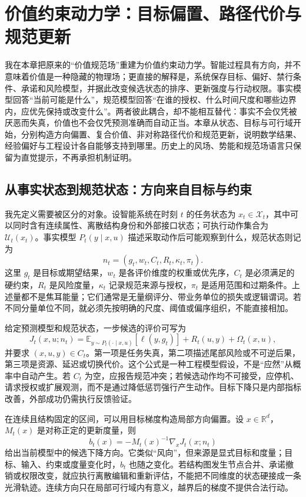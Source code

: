 \chapter{价值约束动力学：目标偏置、路径代价与规范更新}
\label{chp:value_gauge_field}

我在本章把原来的“价值规范场”重建为价值约束动力学。智能过程具有方向，并不意味着价值是一种隐藏的物理场；更直接的解释是，系统保存目标、偏好、禁行条件、承诺和风险模型，并据此改变候选状态的排序、更新强度与行动权限。事实模型回答“当前可能是什么”，规范模型回答“在谁的授权、什么时间尺度和哪些边界内，应优先保持或改变什么”。两者彼此耦合，却不能相互替代：事实不会仅凭被厌恶而失真，价值也不会仅凭预测准确而自动正当。本章从状态、目标与可行域开始，分别构造方向偏置、复合价值、非对称路径代价和规范更新，说明数学结果、经验偏好与工程设计各自能够支持到哪里。历史上的风场、势能和规范场语言只保留为直觉提示，不再承担机制证明。

\section{从事实状态到规范状态：方向来自目标与约束}
\label{sec:section_6725}

我先定义需要被区分的对象。设智能系统在时刻 $t$ 的任务状态为 $x_t\in\mathcal X_t$，其中可以同时含有连续属性、离散结构身份和外部接口状态；可执行动作集合为 $\mathcal U_t(x_t)$。事实模型 $P_t(y\mid x,u)$ 描述采取动作后可能观察到什么，规范状态则记为
\begin{equation}
    n_t=(g_t,w_t,C_t,R_t,\kappa_t,\pi_t).
\end{equation}
这里 $g_t$ 是目标或期望结果，$w_t$ 是各评价维度的权重或优先序，$C_t$ 是必须满足的硬约束，$R_t$ 是风险度量，$\kappa_t$ 记录规范来源与授权，$\pi_t$ 是适用范围和过期条件。上述量都不是焦耳能量；它们通常是无量纲评分、带业务单位的损失或逻辑谓词。若不同分量单位不同，就必须先按明确的尺度、阈值或偏序组织，不能直接相加。

给定预测模型和规范状态，一步候选的评价可写为
\begin{equation}
    J_t(x,u;n_t)
    =\mathbb E_{y\sim P_t(\cdot\mid x,u)}[\ell(y,g_t)]
     +R_t(u,y)+\Omega_t(x,u),
\end{equation}
并要求 $(x,u,y)\in C_t$。第一项是任务失真，第二项描述尾部风险或不可逆后果，第三项是资源、延迟或切换代价。这个公式是一种工程模型假设，不是“应然”从概率中自动产生。若 $C_t$ 为空，应报告规范冲突；若候选动作均不可接受，应停机、请求授权或扩展观测，而不是通过降低惩罚强行产生动作。目标下降只是内部指标改善，外部成功仍需执行反馈验证。

在连续且结构固定的区间，可以用目标梯度构造局部方向偏置。设 $x\in\mathbb R^d$，$M_t(x)$ 是对称正定的更新度量，则
\begin{equation}
    b_t(x)=-M_t(x)^{-1}\nabla_x J_t(x;n_t)
\end{equation}
给出当前模型中的候选下降方向。它类似“风向”，但来源是显式目标和度量；目标、输入、约束或度量变化时，$b_t$ 也随之变化。若结构图发生节点合并、承诺撤销或权限改变，就应执行离散编辑和重新评估，不能把不同维度的状态硬接成一条光滑轨迹。连续方向只在局部可行域内有意义，越界后的梯度不提供合法行动。

